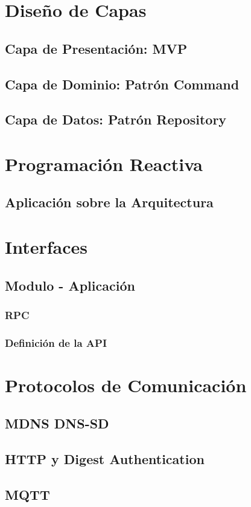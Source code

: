 \section{Diseño de Capas}

\subsection{Capa de Presentación: MVP}
\subsection{Capa de Dominio: Patrón Command}
\subsection{Capa de Datos: Patrón Repository}

\section{Programación Reactiva}
\subsection{Aplicación sobre la Arquitectura}

\section{Interfaces}
\subsection{Modulo - Aplicación}
\subsubsection{RPC}
\subsubsection{Definición de la API}

\section{Protocolos de Comunicación}
\subsection{MDNS DNS-SD}
\subsection{HTTP y Digest Authentication}
\subsection{MQTT}

